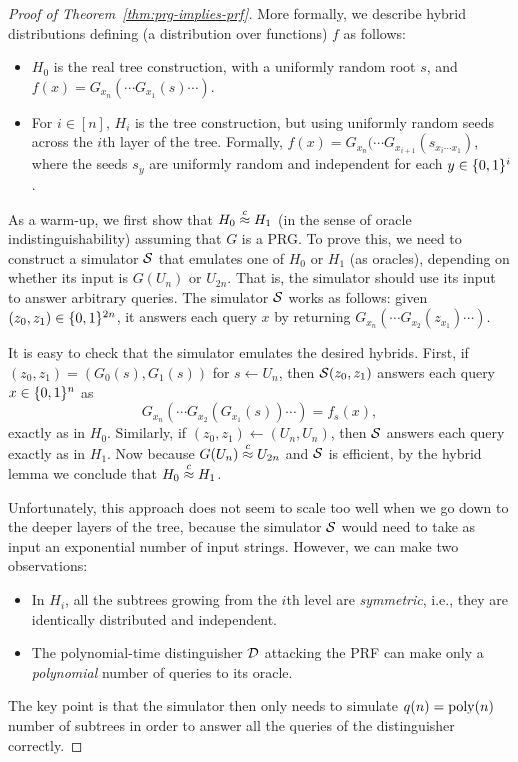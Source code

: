 \documentclass[11pt]{article}
\begin{document}
\begin{proof}[Proof of Theorem~\ref{thm:prg-implies-prf}]
  More formally, we describe hybrid distributions defining (a
  distribution over functions) $f$ as follows:
  \begin{itemize}
  \item $H_{0}$ is the real tree construction, with a uniformly random
    root $s$, and $f(x) = G_{x_{n}}(\cdots G_{x_{1}}(s) \cdots)$.
  \item For $i \in [n]$, $H_{i}$ is the tree construction, but using
    uniformly random seeds across the $i$th layer of the tree.
    Formally, $f(x) = G_{x_{n}}(\cdots G_{x_{i+1}}(s_{x_{i}\cdots
      x_{1}})$, where the seeds $s_{y}$ are uniformly random and
    independent for each $y \in \{0,1\}^{i}$.
  \end{itemize}
  
  As a warm-up, we first show that $H_{0} \stackrel{c}{\approx} H_{1}$ (in the
  sense of oracle indistinguishability) assuming that $G$ is a PRG.
  To prove this, we need to construct a simulator $\mathcal{S}$ that emulates
  one of $H_{0}$ or $H_{1}$ (as oracles), depending on whether its
  input is $G(U_{n})$ or $U_{2n}$.  That is, the simulator should use
  its input to answer arbitrary queries.  The simulator $\mathcal{S}$ works
  as follows: given $(z_{0}, z_{1}) \in \{0,1\}^{2n}$, it answers each
  query $x$ by returning $G_{x_{n}}(\cdots G_{x_{2}}(z_{x_{1}})\cdots
  )$.

  It is easy to check that the simulator emulates the desired hybrids.
  First, if $(z_{0}, z_{1}) = (G_{0}(s), G_{1}(s))$ for $s \gets
  U_{n}$, then $\mathcal{S}(z_{0}, z_{1})$ answers each query $x \in
  \{0,1\}^{n}$ as
  \[ G_{x_{n}}(\cdots G_{x_{2}}(G_{x_{1}}(s)) \cdots ) = f_{s}(x), \]
  exactly as in $H_{0}$.  Similarly, if $(z_0, z_1) \gets (U_n,
  U_n)$, then $\mathcal{S}$ answers each query exactly as in $H_{1}$.  Now
  because $G(U_{n}) \stackrel{c}{\approx} U_{2n}$ and $\mathcal{S}$ is efficient, by the
  hybrid lemma we conclude that $H_0 \stackrel{c}{\approx} H_1$.

  Unfortunately, this approach does not seem to scale too well when we
  go down to the deeper layers of the tree, because the simulator
  $\mathcal{S}$ would need to take as input an exponential number of input
  strings.  However, we can make two observations:
  \begin{itemize}
  \item In $H_{i}$, all the subtrees growing from the $i$th level are
    \emph{symmetric}, i.e., they are identically distributed and
    independent.
  \item The polynomial-time distinguisher $\mathcal{D}$ attacking the PRF
    can make only a \emph{polynomial} number of queries to its oracle.
  \end{itemize}
  The key point is that the simulator then only needs to simulate
  $q(n) = \operatorname{poly}(n)$ number of subtrees in order to answer all the
  queries of the distinguisher correctly.


\end{proof}
\end{document}
